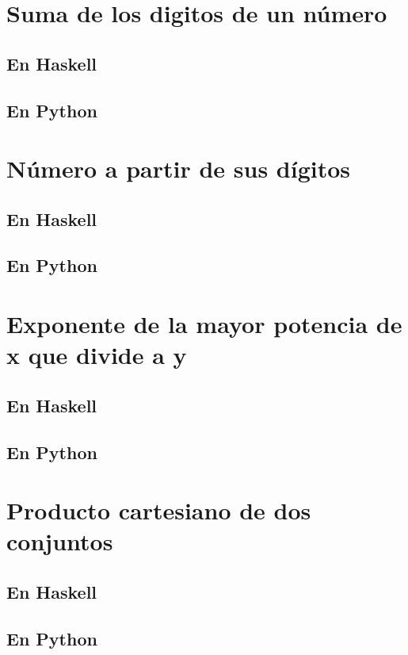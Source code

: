 \documentclass[a4paper,12pt,twoside]{book}
\begin{document}
\section{Suma de los digitos de un número}
\subsection*{En Haskell}
\subsection*{En Python}

\section{Número a partir de sus dígitos}
\subsection*{En Haskell}
\subsection*{En Python}

\section{Exponente de la mayor potencia de x que divide a y}
\subsection*{En Haskell}
\subsection*{En Python}

\section{Producto cartesiano de dos conjuntos}
\subsection*{En Haskell}
\subsection*{En Python}
\end{document}
